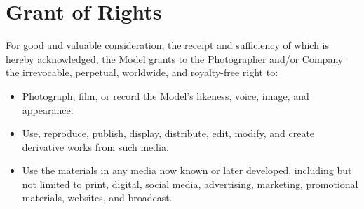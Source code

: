 
\section{Grant of Rights}
\label{sec:rights}

For good and valuable consideration, the receipt and sufficiency of which is hereby acknowledged, the Model grants to the Photographer and/or Company the irrevocable, perpetual, worldwide, and royalty-free right to:

\begin{itemize}
  \item Photograph, film, or record the Model’s likeness, voice, image, and appearance.
  \item Use, reproduce, publish, display, distribute, edit, modify, and create derivative works from such media.
  \item Use the materials in any media now known or later developed, including but not limited to print, digital, social media, advertising, marketing, promotional materials, websites, and broadcast.
\end{itemize}

